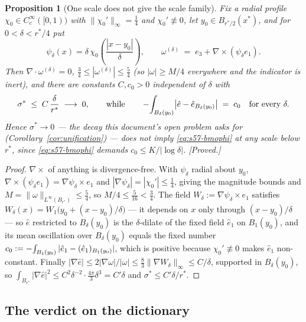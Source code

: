 \documentclass[11pt]{article}
\newtheorem{proposition}[theorem]{Proposition}
\theoremstyle{definition}
\theoremstyle{remark}
\newcommand{\Xint}{\mathop{\mathchoice{\vcenter{\hbox{$\displaystyle-$}}}%
  {\vcenter{\hbox{$\textstyle-$}}}%
  {\vcenter{\hbox{$\scriptstyle-$}}}%
  {\vcenter{\hbox{$\scriptscriptstyle-$}}}}\!\int}
\providecommand{\fint}{\Xint}
\begin{document}
\begin{proposition}[One scale does not give the scale family]
  \label{prop:s57-onescale}
  Fix a radial profile $\chi_0\in C^\infty_c([0,1))$ with
  $\|\chi_0'\|_\infty=\tfrac14$ and $\chi_0'\not\equiv0$, let
  $y_0\in B_{r^*/2}(x^*)$, and for $0<\delta<r^*/4$ put
  \[
    \psi_\delta(x)=\delta\,\chi_0\!\left(\frac{|x-y_0|}{\delta}\right),
    \qquad
    \omega^{(\delta)} \;=\; e_3+\nabla\times(\psi_\delta e_1).
  \]
  Then $\nabla\cdot\omega^{(\delta)}=0$, $\tfrac34\leq|\omega^{(\delta)}|
  \leq\tfrac54$ (so $|\omega|\geq M/4$ everywhere and the indicator is
  inert), and there are constants $C,c_0>0$ independent of $\delta$ with
  \[
    \sigma^*\;\leq\;C\,\frac{\delta}{r^*}\;\longrightarrow\;0,
    \qquad\text{while}\qquad
    \fint_{B_\delta(y_0)}\bigl|\hat e-\hat e_{B_\delta(y_0)}\bigr|\;=\;c_0
    \quad\text{for every }\delta .
  \]
  Hence $\sigma^*\to0$ --- the decay this document's open problem asks for
  (Corollary~\ref{cor:unification}) --- does not imply
  \eqref{eq:s57-bmophi} at any scale below $r^*$, since \eqref{eq:s57-bmophi}
  demands $c_0\leq K/|\log\delta|$. \emph{[Proved.]}
\end{proposition}
\begin{proof}
  $\nabla\times$ of anything is divergence-free. With $\psi_\delta$ radial
  about $y_0$, $\nabla\times(\psi_\delta e_1)=\nabla\psi_\delta\times e_1$ and
  $|\nabla\psi_\delta|=|\chi_0'|\leq\tfrac14$, giving the magnitude bounds and
  $M=\|\omega\|_{L^\infty(B_{r^*})}\leq\tfrac54$, so $M/4\leq\tfrac{5}{16}
  <\tfrac34$. The field $W_\delta:=\nabla\psi_\delta\times e_1$ satisfies
  $W_\delta(x)=W_1\bigl(y_0+(x-y_0)/\delta\bigr)$ --- it depends on $x$ only
  through $(x-y_0)/\delta$ --- so $\hat e$ restricted to $B_\delta(y_0)$ is
  the $\delta$-dilate of the fixed field $\hat e_1$ on $B_1(y_0)$, and its
  mean oscillation over $B_\delta(y_0)$ equals the fixed number
  $c_0:=\fint_{B_1(y_0)}|\hat e_1-(\hat e_1)_{B_1(y_0)}|$, which is positive
  because $\chi_0'\not\equiv0$ makes $\hat e_1$ non-constant. Finally
  $|\nabla\hat e|\leq2|\nabla\omega|/|\omega|\leq
  \tfrac83\|\nabla W_\delta\|_\infty\leq C/\delta$, supported in
  $B_\delta(y_0)$, so $\int_{B_{r^*}}|\nabla\hat e|^2\leq
  C^2\delta^{-2}\cdot\tfrac{4\pi}{3}\delta^3=C'\delta$ and
  $\sigma^*\leq C'\delta/r^*$.
\end{proof}

\subsection{The verdict on the dictionary}
\label{subsec:s57-verdict}
\end{document}
